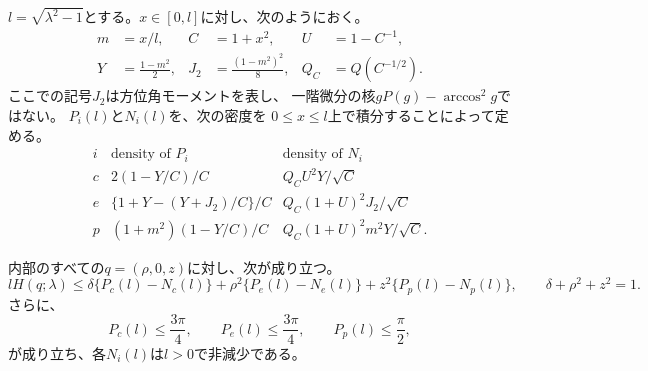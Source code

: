 $l=\sqrt{\lambda^2-1}$とする。$x\in[0,l]$に対し、次のようにおく。
\[
\begin{aligned}
 m&=x/l,& C&=1+x^2,& U&=1-C^{-1},\\
 Y&=\frac{1-m^2}{2},& J_2&=\frac{(1-m^2)^2}{8},&
 Q_C&=Q(C^{-1/2}).
\end{aligned}
\]
ここでの記号$J_2$は方位角モーメントを表し、
一階微分の核$gP(g)-\arccos^2g$ではない。
$P_i(l)$と$N_i(l)$を、次の密度を
$0\leq x\leq l$上で積分することによって定める。
\begin{equation}
\begin{array}{c|c|c}
 i & \text{density of }P_i & \text{density of }N_i\\ \hline
 c & 2(1-Y/C)/C
   & Q_C U^2Y/\sqrt C\\[2pt]
 e & \{1+Y-(Y+J_2)/C\}/C
   & Q_C(1+U)^2J_2/\sqrt C\\[2pt]
 p & (1+m^2)(1-Y/C)/C
   & Q_C(1+U)^2m^2Y/\sqrt C .
\end{array}
\label{eq:pt-three-coefficient-densities}
\end{equation}

\begin{lemma}[凸結合による評価]
\label{lem:pt-convex-bound}
内部のすべての$q=(\rho,0,z)$に対し、次が成り立つ。
\begin{equation}
 lH(q;\lambda)\leq
 \delta\{P_c(l)-N_c(l)\}
 +\rho^2\{P_e(l)-N_e(l)\}
 +z^2\{P_p(l)-N_p(l)\},
 \qquad \delta+\rho^2+z^2=1.
\label{eq:pt-convex-bound}
\end{equation}
さらに、
\begin{equation}
 P_c(l)\leq\frac{3\pi}{4},\qquad
 P_e(l)\leq\frac{3\pi}{4},\qquad
 P_p(l)\leq\frac{\pi}{2},
\label{eq:pt-positive-coefficient-bounds}
\end{equation}
が成り立ち、各$N_i(l)$は$l>0$で非減少である。
\end{lemma}


